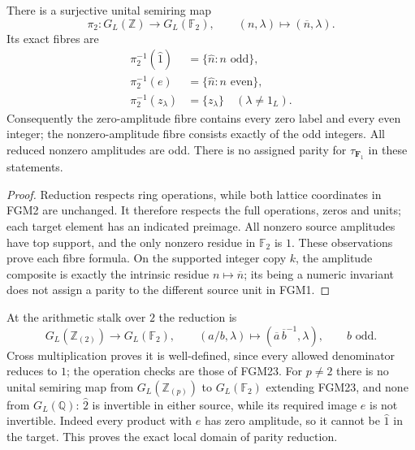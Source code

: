 \begin{proposition}
There is a surjective unital semiring map
\begin{equation}\tag{FGM23}
 \pi_2:G_L(\mathbb Z)\longrightarrow G_L(\mathbb F_2),
 \qquad (n,\lambda)\longmapsto(\overline n,\lambda).
\end{equation}
Its exact fibres are
\begin{equation}\tag{FGM24}
 \begin{aligned}
 \pi_2^{-1}(\widehat1)&=\{\widehat n:n\text{ odd}\},\\
 \pi_2^{-1}(e)&=\{\widehat n:n\text{ even}\},\\
 \pi_2^{-1}(z_\lambda)&=\{z_\lambda\}\quad(\lambda\ne1_L).
 \end{aligned}
\end{equation}
Consequently the zero-amplitude fibre contains every zero label and
every even integer; the nonzero-amplitude fibre consists exactly of
the odd integers. All reduced nonzero amplitudes are odd. There is
no assigned parity for $\tau_{\mathbf F_1}$ in these statements.
\end{proposition}
\begin{proof}
Reduction respects ring operations, while both lattice coordinates
in FGM2 are unchanged. It therefore respects the full operations,
zeros and units; each target element has an indicated preimage.
All nonzero source amplitudes have top support, and the only
nonzero residue in $\mathbb F_2$ is $1$. These observations prove
each fibre formula. On the supported integer copy $k$, the
amplitude composite is exactly the intrinsic residue
$n\mapsto\overline n$; its being a numeric invariant does not
assign a parity to the different source unit in FGM1.
\end{proof}

At the arithmetic stalk over $2$ the reduction is
\begin{equation}\tag{FGM25}
 G_L(\mathbb Z_{(2)})\longrightarrow G_L(\mathbb F_2),\qquad
 (a/b,\lambda)\longmapsto(\overline a\,\overline b^{-1},\lambda),
 \qquad b\text{ odd}.
\end{equation}
Cross multiplication proves it is well-defined, since every
allowed denominator reduces to $1$; the operation checks are
those of FGM23. For $p\ne2$ there is no unital semiring map from
$G_L(\mathbb Z_{(p)})$ to $G_L(\mathbb F_2)$ extending FGM23,
and none from $G_L(\mathbb Q)$: $\widehat2$ is invertible in
either source, while its required image $e$ is not invertible.
Indeed every product with $e$ has zero amplitude, so it cannot
be $\widehat1$ in the target. This proves the exact local domain
of parity reduction.

